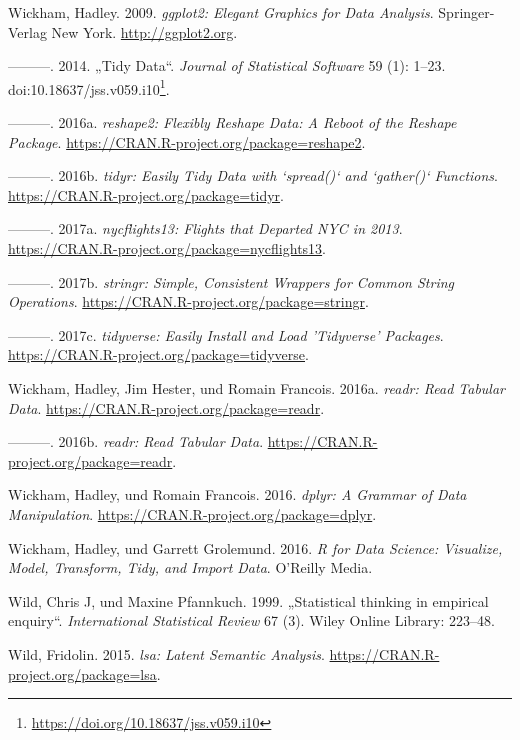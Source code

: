 \documentclass[12pt,ngerman,]{book}
\let\rmarkdownfootnote\footnote%
\def\footnote{\protect\rmarkdownfootnote}
\renewcommand{\href}[2]{#2\footnote{\url{#1}}}
\begin{document}
\hypertarget{ref-R-ggplot2}{}
Wickham, Hadley. 2009. \emph{ggplot2: Elegant Graphics for Data
Analysis}. Springer-Verlag New York. \url{http://ggplot2.org}.

\hypertarget{ref-tidydata}{}
---------. 2014. „Tidy Data``. \emph{Journal of Statistical Software} 59
(1): 1--23.
doi:\href{https://doi.org/10.18637/jss.v059.i10}{10.18637/jss.v059.i10}.

\hypertarget{ref-R-reshape2}{}
---------. 2016a. \emph{reshape2: Flexibly Reshape Data: A Reboot of the
Reshape Package}. \url{https://CRAN.R-project.org/package=reshape2}.

\hypertarget{ref-R-tidyr}{}
---------. 2016b. \emph{tidyr: Easily Tidy Data with `spread()` and
`gather()` Functions}. \url{https://CRAN.R-project.org/package=tidyr}.

\hypertarget{ref-R-nycflights13}{}
---------. 2017a. \emph{nycflights13: Flights that Departed NYC in
2013}. \url{https://CRAN.R-project.org/package=nycflights13}.

\hypertarget{ref-R-stringr}{}
---------. 2017b. \emph{stringr: Simple, Consistent Wrappers for Common
String Operations}. \url{https://CRAN.R-project.org/package=stringr}.

\hypertarget{ref-R-tidyverse}{}
---------. 2017c. \emph{tidyverse: Easily Install and Load 'Tidyverse'
Packages}. \url{https://CRAN.R-project.org/package=tidyverse}.

\hypertarget{ref-readr}{}
Wickham, Hadley, Jim Hester, und Romain Francois. 2016a. \emph{readr:
Read Tabular Data}. \url{https://CRAN.R-project.org/package=readr}.

\hypertarget{ref-R-readr}{}
---------. 2016b. \emph{readr: Read Tabular Data}.
\url{https://CRAN.R-project.org/package=readr}.

\hypertarget{ref-R-dplyr}{}
Wickham, Hadley, und Romain Francois. 2016. \emph{dplyr: A Grammar of
Data Manipulation}. \url{https://CRAN.R-project.org/package=dplyr}.

\hypertarget{ref-r4ds}{}
Wickham, Hadley, und Garrett Grolemund. 2016. \emph{R for Data Science:
Visualize, Model, Transform, Tidy, and Import Data}. O'Reilly Media.

\hypertarget{ref-wild1999statistical}{}
Wild, Chris J, und Maxine Pfannkuch. 1999. „Statistical thinking in
empirical enquiry``. \emph{International Statistical Review} 67 (3).
Wiley Online Library: 223--48.

\hypertarget{ref-R-lsa}{}
Wild, Fridolin. 2015. \emph{lsa: Latent Semantic Analysis}.
\url{https://CRAN.R-project.org/package=lsa}.
\end{document}
